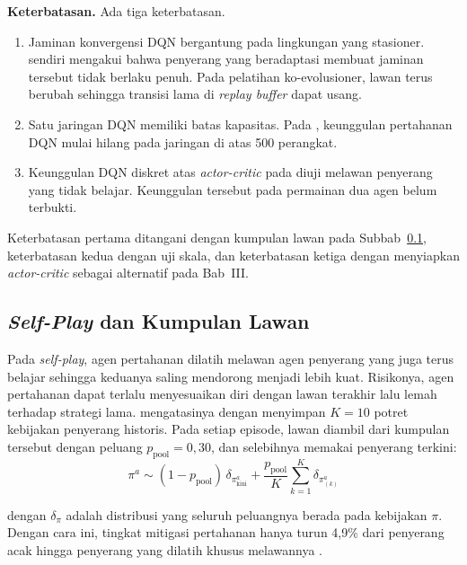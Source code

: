 \textbf{Keterbatasan.} Ada tiga keterbatasan.
\begin{enumerate}
	\item Jaminan konvergensi DQN bergantung pada lingkungan yang stasioner. \textcite{skowronski2026adaptive} sendiri mengakui bahwa penyerang yang beradaptasi membuat jaminan tersebut tidak berlaku penuh. Pada pelatihan ko-evolusioner, lawan terus berubah sehingga transisi lama di \textit{replay buffer} dapat usang.
	\item Satu jaringan DQN memiliki batas kapasitas. Pada \textcite{wushishi2026coadam}, keunggulan pertahanan DQN mulai hilang pada jaringan di atas 500 perangkat.
	\item Keunggulan DQN diskret atas \textit{actor-critic} pada \textcite{skowronski2026adaptive} diuji melawan penyerang yang tidak belajar. Keunggulan tersebut pada permainan dua agen belum terbukti.
\end{enumerate}
Keterbatasan pertama ditangani dengan kumpulan lawan pada Subbab~\ref{subsec:selfplay}, keterbatasan kedua dengan uji skala, dan keterbatasan ketiga dengan menyiapkan \textit{actor-critic} sebagai alternatif pada Bab~III.

\subsection{\textit{Self-Play} dan Kumpulan Lawan}
\label{subsec:selfplay}
Pada \textit{self-play}, agen pertahanan dilatih melawan agen penyerang yang juga terus belajar sehingga keduanya saling mendorong menjadi lebih kuat. Risikonya, agen pertahanan dapat terlalu menyesuaikan diri dengan lawan terakhir lalu lemah terhadap strategi lama. \textcite{wushishi2026coadam} mengatasinya dengan menyimpan $K = 10$ potret kebijakan penyerang historis. Pada setiap episode, lawan diambil dari kumpulan tersebut dengan peluang $p_{\text{pool}} = 0{,}30$, dan selebihnya memakai penyerang terkini:
\begin{equation}
\pi^{a} \sim (1 - p_{\text{pool}})\, \delta_{\pi^{a}_{\text{kini}}} + \frac{p_{\text{pool}}}{K} \sum_{k=1}^{K} \delta_{\pi^{a}_{(k)}}
\label{eq:pool}
\end{equation}

\noindent dengan $\delta_{\pi}$ adalah distribusi yang seluruh peluangnya berada pada kebijakan $\pi$. Dengan cara ini, tingkat mitigasi pertahanan hanya turun 4,9\% dari penyerang acak hingga penyerang yang dilatih khusus melawannya \parencite{wushishi2026coadam}.


